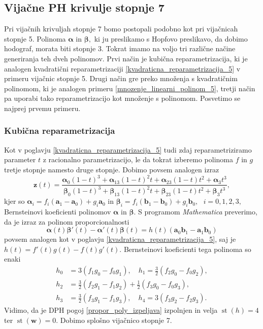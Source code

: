 \documentclass[12pt,a4paper,twoside]{article}
\theoremstyle{definition} %
\theoremstyle{plain} %
\theoremstyle{primerstyle}
\numberwithin{equation}{section}  %
\newcommand{\aV}{\mathbf{a}}
\newcommand{\bV}{\mathbf{b}}
\newcommand{\wV}{\mathbf{w}}
\newcommand{\zV}{\mathbf{z}}
\newcommand{\balpha}{\boldsymbol \alpha}
\newcommand{\bbeta}{\boldsymbol \beta}
\DeclareMathOperator{\st}{st}
\begin{document}
\subsection{Vijačne PH krivulje stopnje 7}
\label{podpoglavje_vijacne7stopnje}

Pri vijačnih krivuljah stopnje 7 bomo postopali podobno kot pri vijačnicah stopnje 5. Polinoma $\balpha$ in $\bbeta,$ ki ju preslikamo s Hopfovo preslikavo, da dobimo hodograf, morata biti stopnje 3. Tokrat imamo na voljo tri različne načine generiranja teh dveh polinomov. Prvi način je kubična reparametrizacija, ki je analogen kvadratični reparametrizaciji \ref{kvadraticna_reparametrizacija_5} v primeru vijačnic stopnje 5. Drugi način gre preko množenja s kvadratičnim polinomom, ki je analogen primeru \ref{mnozenje_linearni_polinom_5}, tretji način pa uporabi tako reparametrizacijo kot množenje s polinomom. Posvetimo se najprej prvemu primeru.

\subsubsection{Kubična reparametrizacija}
\label{kubicna_reparametrizacija_7}

Kot v poglavju \ref{kvadraticna_reparametrizacija_5} tudi zdaj reparametriziramo parameter $t$ z racionalno parametrizacijo, le da tokrat izberemo polinoma $f$ in $g$ tretje stopnje namesto druge stopnje. Dobimo povsem analogen izraz
\begin{equation*}
	\zV(t)=\frac{\balpha_0(1-t)^3+\balpha_13(1-t)^2t+\balpha_23(1-t)t^2+\balpha_3t^3}{\bbeta_0(1-t)^3+\bbeta_13(1-t)^2t+\bbeta_23(1-t)t^2+\bbeta_3t^3},
\end{equation*}
kjer so $\balpha_i=f_i(\aV_1-\aV_0)+g_i\aV_0$ in $\bbeta_i=f_i(\bV_1-\bV_0)+g_i\bV_0,\text{ }i=0,1,2,3,$ Bernsteinovi koeficienti polinomov $\balpha$ in $\bbeta.$ S programom \emph{Mathematica} preverimo, da je izraz za polinom proporcionalnosti
\begin{equation*}
	\balpha(t)\bbeta'(t)-\balpha'(t)\bbeta(t)=h(t)(\aV_0\bV_1-\aV_1\bV_0)
\end{equation*}
povsem analogen kot v poglavju \ref{kvadraticna_reparametrizacija_5}, saj je $h(t)=f'(t)g(t)-f(t)g'(t).$ Bernsteinovi koeficienti tega polinoma so enaki
\begin{align}
	h_0&=3(f_1g_0-f_0g_1),\quad h_1=\frac{3}{2}(f_2g_0-f_0g_2),\nonumber\\
	h_2&=\frac{3}{2}(f_2g_1-f_1g_2)+\frac{1}{2}(f_3g_0-f_0g_3),\label{h_coeffs_cubic_repara}\\
	h_3&=\frac{3}{2}(f_3g_1-f_1g_3),\quad h_4=3(f_3g_2-f_2g_3).\nonumber
\end{align}
Vidimo, da je DPH pogoj \eqref{propor_poly_izpeljava} izpolnjen in velja $\st(h)=4$ ter $\st(\wV)=0.$ Dobimo splošno vijačnico stopnje 7.
\end{document}
